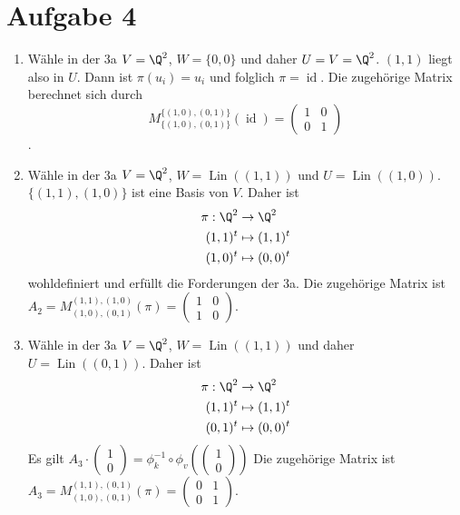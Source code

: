 \documentclass{article}
\newcommand{\id}{\operatorname{id}}
\newcommand{\lin}{\operatorname{Lin}}
\begin{document}
    \section*{Aufgabe 4}
    \begin{enumerate}
    \item Wähle in der 3a $V = \Q^2$, $W = \{0,0\}$ und daher $U = V = \Q^2$. $(1,1)$ liegt also in $U$. Dann ist $\pi(u_i) = u_i$ und folglich $\pi = \id$. Die zugehörige Matrix berechnet sich durch $$M^{\{(1,0), (0,1)\}}_{\{(1,0), (0,1)\}} (\id) = \begin{pmatrix}1&0\\0&1\end{pmatrix}$$.
    \item Wähle in der 3a $V = \Q^2$, $W = \lin((1,1))$ und $U = \lin((1,0))$. $\{(1,1), (1,0)\}$ ist eine Basis von $V$. Daher ist
    \begin{align*}
        \pi: \Q^2 &\to \Q^2\\
        (1,1)^t &\mapsto (1,1)^t\\
        (1,0)^t &\mapsto (0,0)^t\\
    \end{align*} wohldefiniert und erfüllt die Forderungen der 3a.
    Die zugehörige Matrix ist $A_2 = M^{(1,1), (1,0)}_{(1,0), (0,1)}(\pi) = \begin{pmatrix}1&0\\1&0\end{pmatrix}$.
    \item Wähle in der 3a $V = \Q^2$, $W = \lin((1,1))$ und daher $U = \lin((0,1))$.
    Daher ist 
    \begin{align*}
        \pi: \Q^2 &\to \Q^2\\
        (1,1)^t &\mapsto (1,1)^t\\
        (0,1)^t &\mapsto (0,0)^t\\
    \end{align*}
    Es gilt $A_3\cdot \begin{pmatrix}1 \\ 0\end{pmatrix} = \phi_k^{-1} \circ \phi_v\left(\begin{pmatrix}1 \\ 0\end{pmatrix}\right)$
    Die zugehörige Matrix ist $A_3 = M^{(1,1), (0,1)}_{(1,0), (0,1)}(\pi) = \begin{pmatrix}0&1\\0&1\end{pmatrix}$.
    \end{enumerate}
\end{document}
